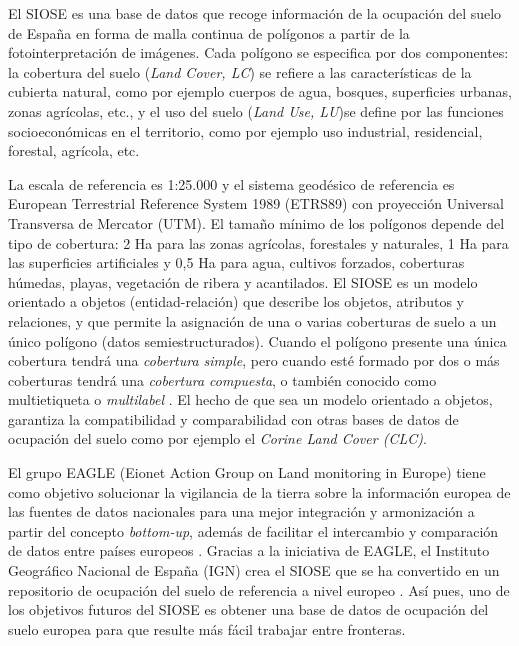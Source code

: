 El SIOSE es una base de datos que recoge información de la ocupación del suelo de España en forma de malla continua de polígonos a partir de la fotointerpretación de imágenes. Cada polígono se especifica por dos componentes: la cobertura del suelo (\textit{Land Cover, LC}) se refiere a las características de la cubierta natural, como por ejemplo cuerpos de agua, bosques, superficies urbanas, zonas agrícolas, etc., y el uso del suelo (\textit{Land Use, LU})se define por las funciones socioeconómicas en el territorio, como por ejemplo uso industrial, residencial, forestal, agrícola, etc.

La escala de referencia es 1:25.000 y el sistema geodésico de referencia es European Terrestrial Reference System 1989 (ETRS89) con proyección Universal Transversa de Mercator (UTM). El tamaño mínimo de los polígonos depende del tipo de cobertura: 2 Ha para las zonas agrícolas, forestales y naturales, 1 Ha para las superficies artificiales y 0,5 Ha para agua, cultivos forzados, coberturas húmedas, playas, vegetación de ribera y acantilados. El SIOSE es un modelo orientado a objetos (entidad-relación) que describe los objetos, atributos y relaciones, y que permite la asignación de una o varias coberturas de suelo a un único polígono (datos semiestructurados). Cuando el polígono presente una única cobertura tendrá una \textit{cobertura simple}, pero cuando esté formado por dos o más coberturas tendrá una \textit{cobertura compuesta}, o también conocido como multietiqueta o \textit{multilabel} \citep{EquipoTecnicoNacionalSIOSE2015}. El hecho de que sea un modelo orientado a objetos, garantiza la compatibilidad y comparabilidad con otras bases de datos de ocupación del suelo como por ejemplo el \textit{Corine Land Cover (CLC)}.


El grupo EAGLE (Eionet Action Group on Land monitoring in Europe) tiene como objetivo solucionar la vigilancia de la tierra sobre la información europea de las fuentes de datos nacionales para una mejor integración y armonización a partir del concepto \textit{bottom-up}, además de facilitar el intercambio y comparación de datos entre países europeos \citep{Arnold2013}. Gracias a la iniciativa de EAGLE, el Instituto Geográfico Nacional de España (IGN) crea el SIOSE que se ha convertido en un repositorio de ocupación del suelo de referencia a nivel europeo \citep{EquipoTecnicoNacionalSIOSE2015}. Así pues, uno de los objetivos futuros del SIOSE es obtener una base de datos de ocupación del suelo europea para que resulte más fácil trabajar entre fronteras.

